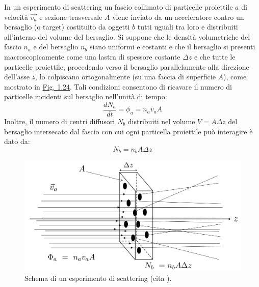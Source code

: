 \documentclass[12pt,a4paper,twoside]{report}
\begin{document}
	In un esperimento di scattering un fascio collimato di particelle proiettile $a$ di velocità $\vec{v_a}$ e sezione trasversale $A$ viene inviato da un acceleratore contro un bersaglio (o target) costituito da oggetti $b$ tutti uguali tra loro e distribuiti all'interno del volume del bersaglio. Si suppone che le densità volumetriche del fascio $n_a$ e del bersaglio $n_b$ siano uniformi e costanti e che il bersaglio si presenti macroscopicamente come una lastra di spessore costante $\Delta z$ e che tutte le particelle proiettile, procedendo verso il bersaglio parallelamente alla direzione dell'asse $z$, lo colpiscano ortogonalmente (su una faccia di superficie $A$), come mostrato in \hyperref[fig:scattering]{Fig. 1.24}. Tali condizioni consentono di ricavare il numero di particelle incidenti sul bersaglio nell'unità di tempo:
	\begin{equation}
		\frac{dN_a}{dt}=\phi_a=n_av_aA
		\label{eq:scattering1}
	\end{equation}
	Inoltre, il numero di centri diffusori $N_b$ distribuiti nel volume $V=A\Delta z$ del bersaglio intersecato dal fascio con cui ogni particella proiettile può interagire è dato da:
	\begin{equation}
		N_b=n_bA\Delta z
		\label{eq:scattering2}
	\end{equation}
	
	\begin{figure}[H]
		\centering
		\includegraphics[width=0.9\linewidth]{images/scattering.jpg}
		\caption{Schema di un esperimento di scattering (cita
			).}
		\label{fig:scattering}
	\end{figure}
	
\end{document}
